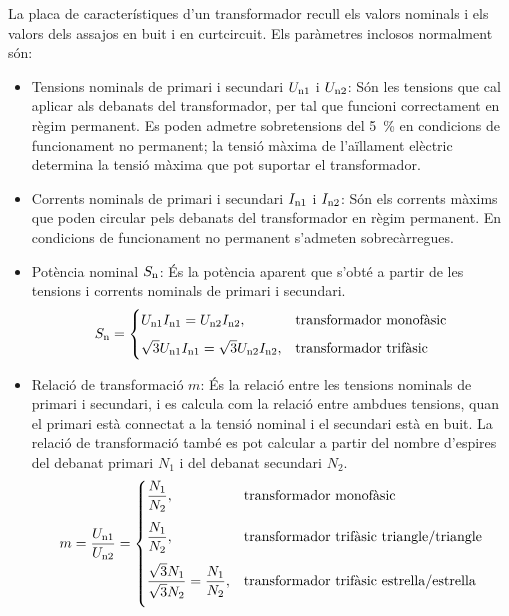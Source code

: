 La  placa de característiques d'un transformador recull els valors nominals  i els valors dels assajos
en buit i en curtcircuit. Els paràmetres inclosos normalment són:
\begin{itemize}
   \item Tensions nominals de primari i secundari  $U_\mathrm{n1}$ i $U_\mathrm{n2}$: Són les tensions que cal aplicar als debanats del transformador, per tal que funcioni correctament en règim permanent. Es poden admetre sobretensions del \qty{5}{\percent} en condicions de funcionament no permanent; la tensió màxima de l'aïllament elèctric determina la tensió màxima que pot suportar el transformador.
   \item Corrents nominals de primari i secundari  $I_\mathrm{n1}$ i $I_\mathrm{n2}$: Són els corrents màxims que poden circular pels debanats del transformador en règim permanent. En condicions de funcionament no permanent s'admeten sobrecàrregues.
   \item Potència nominal $S_\mathrm{n}$: És la potència aparent que s'obté a partir de les tensions i corrents nominals de primari i secundari.
       \begin{equation}
        S_\mathrm{n} = \begin{cases} U_\mathrm{n1} I_\mathrm{n1} = U_\mathrm{n2} I_\mathrm{n2}, & \text{transformador monofàsic} \\[2mm]
        \sqrt{3} U_\mathrm{n1} I_\mathrm{n1} = \sqrt{3} U_\mathrm{n2} I_\mathrm{n2}, & \text{transformador trifàsic} \end{cases}
       \end{equation}
   \item Relació de transformació $m$: És la relació entre les tensions nominals de primari i secundari, i es calcula com la relació entre ambdues tensions, quan el primari està connectat a la tensió nominal i el secundari està en buit. La relació de  transformació també es pot calcular a partir del nombre d'espires del debanat primari $N_1$ i del debanat secundari $N_2$.
       \begin{equation}
        m = \frac{U_\mathrm{n1}}{U_\mathrm{n2}} =  \begin{cases}
        \dfrac{N_1}{N_2}, & \text{transformador monofàsic} \\[0.4cm]
        \dfrac{N_1}{N_2}, & \text{transformador trifàsic triangle/triangle} \\[0.4cm]
        \dfrac{\sqrt{3}N_1}{\sqrt{3}N_2} = \dfrac{N_1}{N_2}, & \text{transformador trifàsic estrella/estrella} \\[0.4cm]

\end{cases}
\end{equation}
\end{itemize}
